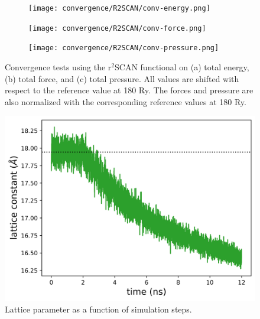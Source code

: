 \begin{figure}[tbhp]
    \centering
    \begin{subfigure}{0.32\textwidth}
        \centering
        \texttt{[image: convergence/R2SCAN/conv-energy.png]}
        \caption{}
    \end{subfigure}
    \hfill
    \begin{subfigure}{0.32\textwidth}
        \centering
        \texttt{[image: convergence/R2SCAN/conv-force.png]}
        \caption{}
    \end{subfigure}
    \hfill
    \begin{subfigure}{0.32\textwidth}
        \centering

        \texttt{[image: convergence/R2SCAN/conv-pressure.png]}
        \caption{}
    \end{subfigure}
    \caption{Convergence tests using the r$^2$SCAN functional on (a) total
        energy,
        (b) total force, and (c) total pressure.  All values are shifted
        with respect to the reference value at 180 Ry. The forces and pressure
        are also normalized with the corresponding reference values at 180 Ry.}
    \label{fig:conv_r2scan}
\end{figure}

\begin{figure}[h!]
    \centering
    \includegraphics[width=0.4\linewidth]{images/330K/conv-lattice.png}
    \caption{Lattice parameter as a function of simulation steps. }
\end{figure}